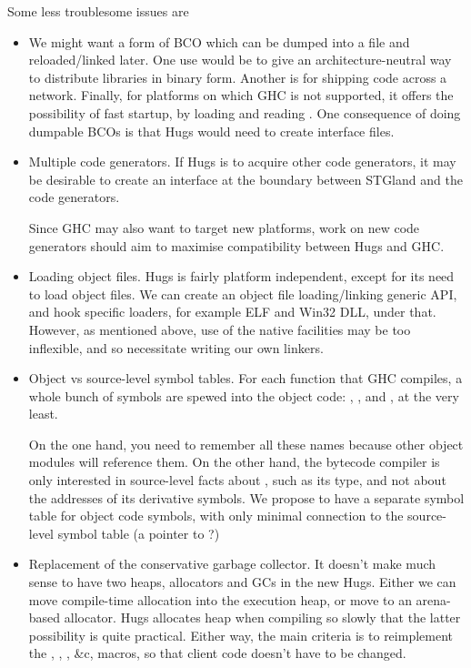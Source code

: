 Some less troublesome issues are

\begin{itemize}
\item
  We might want a form of BCO which can be dumped
  into a file and reloaded/linked later.  One use would be to 
  give an architecture-neutral way to distribute libraries
  in binary form.  Another is for shipping code across a network.
  Finally, for platforms on which GHC is not supported, it offers
  the possibility of fast startup, by loading  and
  reading .  One consequence of doing dumpable
  BCOs is that Hugs would need to create interface files.
\item
  Multiple code generators.  If Hugs is to acquire other code
  generators, it may be desirable to create an interface at the
  boundary between STGland and the code generators.

  Since GHC may also want to target new platforms, work on new
  code generators should aim to maximise compatibility between
  Hugs and GHC.
\item
  Loading object files.  
  Hugs is fairly platform independent, except
  for its need to load object files.  We can
  create an object file loading/linking generic API, and hook
  specific loaders, for example ELF and Win32 DLL, under that. 
  However, as mentioned above, use of the native facilities may be
  too inflexible, and so necessitate writing our own linkers.
\item
  Object vs source-level symbol tables.
  For each function  that GHC compiles, a whole
  bunch of symbols are spewed into the object code: ,
  ,  and , at the very
  least.

  On the one hand, you need to remember all these names because other
  object modules will reference them.  On the other hand, the bytecode
  compiler is only interested in source-level facts about , such as
  its type, and not about the addresses of its derivative symbols.
  We propose to have a
  separate symbol table for object code symbols, with only minimal
  connection to the source-level symbol table (a pointer to
   ?)
\item
  Replacement of the conservative garbage collector.  It doesn't
  make much sense to have two heaps, allocators and GCs in the new Hugs.
  Either we can move compile-time allocation into the
  execution heap, or move to an arena-based allocator.  Hugs allocates
  heap when compiling so slowly that the latter possibility is quite
  practical.  Either way, the main criteria is to reimplement the ,
  , , \&c, macros, so that client code doesn't have to be
  changed.


\end{itemize}
